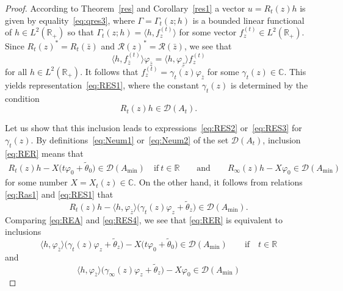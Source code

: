 \documentclass[10pt,a4paper]{amsart}
\numberwithin{equation}{section}
\begin{document}
\begin{proof} According to Theorem~\ref{res} and Corollary~\ref{res1} a vector $u=R_{t} (z) h$ is given by equali\-ty~\eqref{eq:qres3}, where
 $ \Gamma= \Gamma_{t}(z;h)$ is a bounded linear functional of $h\in L^2 ({\mathbb R}_{+})$ so that
 $\Gamma_{t}(z;h)= \big\langle h, f_{z}^{(t)}\big\rangle$
 for some vector $ f_{z}^{(t)} \in L^2 ({\mathbb R}_{+})$.
 Since $R_{t} (z)^*=R_{t} (\bar{z})$ and ${\mathcal R} (z)^*={\mathcal R} (\bar{z})$, we see that
 \[
 \big\langle h, f_{\bar{z}}^{(t)} \big\rangle \varphi_{\bar{z}} =\langle h, \varphi_{z}\rangle f_{z}^{(t)}
 \]
 for all $h\in L^2 ({\mathbb R}_{+})$. It follows that $f_{z}^{(t)} = \overline{\gamma_{t} (z)} \varphi_{\bar{z}}$ for some $\gamma_{t} (z) \in{\mathbb C}$. This yields representation~\eqref{eq:RES1}, where the constant $\gamma_{t} (z) $ is determined by the condition
 \begin{equation}
 R_{t} (z) h\in {\mathcal D} (A_{t}).
 \label{eq:RER}\end{equation}

 Let us show that this inclusion leads to expressions~\eqref{eq:RES2} or~\eqref{eq:RES3} for $\gamma_{t}(z)$.
 By definitions~\eqref{eq:Neum1} or~\eqref{eq:Neum2} of the set ${\mathcal D} (A_{t})$, inclusion \eqref{eq:RER}
 means that
 \begin{gather}
R_{t} (z) h - X \big( t \varphi_{0} + \tilde{\theta}_{0}\big)\in {\mathcal D} (A_{\min}) \quad \mbox{if} \ t\in {\mathbb R}
 \qquad \mbox{and} \qquad R_\infty (z) h - X \varphi_{0} \in {\mathcal D} (A_{\min})
 \label{eq:REA}\end{gather}
 for some number $X=X_{t}(z)\in {\mathbb C}$. On the other hand, it follows from
 relations \eqref{eq:Ras1} and \eqref{eq:RES1} that
 \begin{equation}
R_{t} (z) h -\langle h, \varphi_{\bar{z}}\rangle \big( \gamma_{t} (z) \varphi_{z} + \tilde{\theta}_{z}\big)\in{\mathcal D} (A_{\min}).
 \label{eq:RES4}\end{equation}
 Comparing \eqref{eq:REA} and \eqref{eq:RES4}, we see that \eqref{eq:RER} is equivalent to inclusions
 \begin{equation}
\langle h, \varphi_{\bar{z}}\rangle \big(\gamma_{t} (z) \varphi_{z} + \tilde{\theta}_{z} \big) - X \big( t \varphi_{0} + \tilde{\theta}_{0}\big)\in {\mathcal D} (A_{\min})\qquad \mbox{if} \quad t\in {\mathbb R}
 \label{eq:REA1}\end{equation}
 and
 \begin{equation}
\langle h, \varphi_{\bar{z}}\rangle \big(\gamma_\infty (z) \varphi_{z}+ \tilde{\theta}_{z} \big) - X \varphi_{0} \in {\mathcal D} (A_{\min})
 \label{eq:REA2}\end{equation}


\end{proof}
\end{document}
